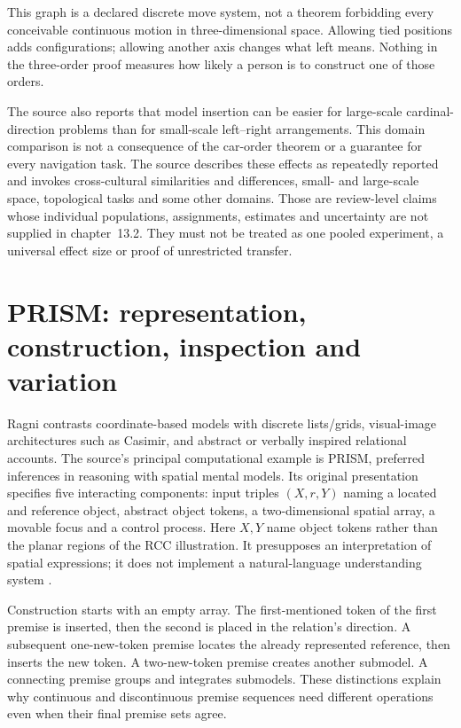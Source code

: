This graph is a declared discrete move system, not a theorem forbidding
every conceivable continuous motion in three-dimensional space. Allowing
tied positions adds configurations; allowing another axis changes what
left means. Nothing in the three-order proof measures how likely a person
is to construct one of those orders.

The source also reports that model insertion can be easier for large-scale
cardinal-direction problems than for small-scale left--right arrangements.
This domain comparison is not a consequence of the car-order theorem or
a guarantee for every navigation task. The source describes these effects as repeatedly reported and invokes
cross-cultural similarities and differences, small- and large-scale space,
topological tasks and some other domains. Those are review-level claims
whose individual populations, assignments, estimates and uncertainty are
not supplied in chapter~13.2. They must not be treated as one pooled
experiment, a universal effect size or proof of unrestricted transfer.

\section{PRISM: representation, construction, inspection and variation}
\label{sec:p19-rat132-prism}

Ragni contrasts coordinate-based models with discrete lists/grids,
visual-image architectures such as Casimir, and abstract or verbally
inspired relational accounts. The source's principal computational example
is PRISM, preferred inferences in reasoning with spatial mental models.
Its original presentation specifies five interacting components: input
triples \((X,r,Y)\) naming a located and reference object, abstract object
tokens, a two-dimensional spatial array, a movable focus and a control
process. Here \(X,Y\) name object tokens rather than the planar regions
of the RCC illustration. It presupposes an interpretation of spatial expressions; it does
not implement a natural-language understanding system
\cite[pp.~563--570]{RagniKnauff2013PRISM}.

Construction starts with an empty array. The first-mentioned token of the
first premise is inserted, then the second is placed in the relation's
direction. A subsequent one-new-token premise locates the already
represented reference, then inserts the new token. A two-new-token premise
creates another submodel. A connecting premise groups and integrates
submodels. These distinctions explain why continuous and discontinuous
premise sequences need different operations even when their final premise
sets agree.


